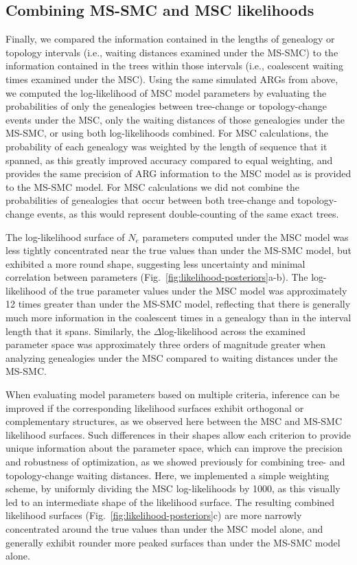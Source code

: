 \documentclass[11pt]{article}
\begin{document}
\subsection{Combining MS-SMC and MSC likelihoods}
Finally, we compared the information contained in the lengths of 
genealogy or topology intervals (i.e., waiting distances examined under the
MS-SMC) to the information contained in the trees within those intervals 
(i.e., coalescent waiting times examined under the MSC). 
% 
Using the same simulated ARGs from above, we computed the log-likelihood
of MSC model parameters by evaluating the probabilities of only the 
genealogies between tree-change or topology-change events under the MSC,
only the waiting distances of those genealogies under the MS-SMC, 
or using both log-likelihoods combined.
% 
For MSC calculations, the probability of each genealogy was weighted 
by the length of sequence that it spanned, as this greatly improved
accuracy compared to equal weighting, and provides the same precision 
of ARG information to the MSC model as is provided to the MS-SMC model.
% 
For MSC calculations we did not combine the probabilities of genealogies
that occur between both tree-change and topology-change events, as this
would represent double-counting of the same exact trees.


The log-likelihood surface of $N_e$ parameters computed under the MSC model
was less tightly concentrated near the true values than under the MS-SMC model,
but exhibited a more round shape, suggesting less uncertainty and minimal 
correlation between parameters 
(Fig.~\ref{fig:likelihood-posteriors}a-b).
The log-likelihood of the true parameter values under the MSC model
was approximately 12 times greater than under the MS-SMC model, 
reflecting that there is generally much more information in the coalescent 
times in a genealogy than in the interval length that it spans.
Similarly, the $\Delta$log-likelihood across the examined parameter space 
was approximately three orders of magnitude greater when analyzing 
genealogies under the MSC compared to waiting distances under the MS-SMC.
% 

When evaluating model parameters based on multiple criteria, inference can 
be improved if the corresponding likelihood surfaces exhibit orthogonal or 
complementary structures, as we observed here between the MSC and MS-SMC
likelihood surfaces. 
Such differences in their shapes allow each criterion to provide unique 
information about the parameter space, which can improve the precision 
and robustness of optimization, as we showed previously for combining tree-
and topology-change waiting distances.
Here, we implemented a simple weighting scheme, 
by uniformly dividing the MSC log-likelihoods by 1000, as this 
visually led to an intermediate shape of the likelihood surface.
The resulting combined likelihood surfaces (Fig.~\ref{fig:likelihood-posteriors}c)
are more narrowly concentrated around the true values than under the MSC
model alone, and generally exhibit rounder more peaked surfaces than under
the MS-SMC model alone. 
\end{document}
